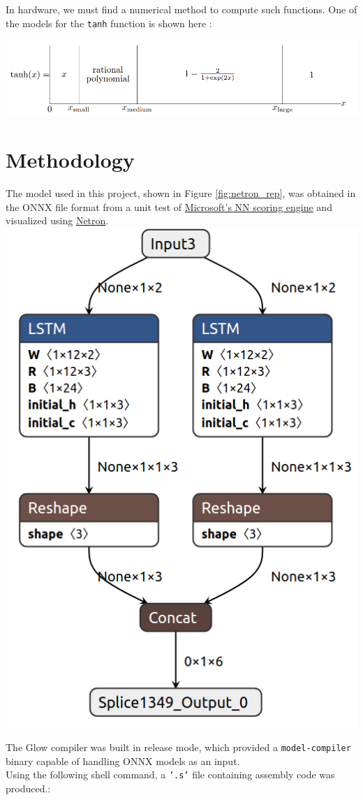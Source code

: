 \documentclass[twocolumn]{article}
\newcommand{\cc}[1]{\texttt{#1}}
\begin{document}
In hardware, we must find a numerical method to compute such functions. One of the models for the \cc{tanh} function is shown here \cite{beebe1991accurate}: 

\begingroup
    \centering
    \medskip
    \includegraphics[width=0.7\columnwidth]{Lab-Tex/final/tanh.png}
    \label{fig:tanh_funcs}
\endgroup




\section{Methodology}


The model used in this project, shown in Figure \ref{fig:netron_rep}, was obtained in the ONNX file format from a unit test of \href{https://github.com/microsoft/onnxruntime}{Microsoft's NN scoring engine} and visualized using \href{https://github.com/netron}{Netron}.\\

\begingroup
    \centering
    \medskip
    \includegraphics[width=0.3\columnwidth]{Lab-Tex/final/bilstm.png}
    \label{fig:netron_rep}
    \medskip
\endgroup

The Glow compiler was built in release mode, which provided a \cc{model-compiler} binary capable of handling ONNX models as an input. \\

Using the following shell command, a \cc{'.s'} file containing assembly code was produced.:
\end{document}
